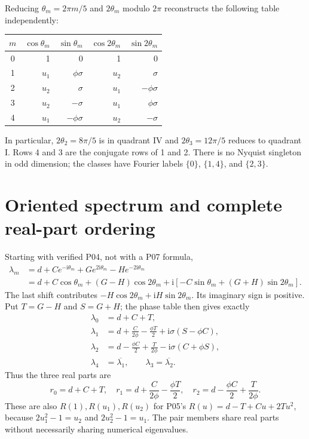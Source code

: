 \documentclass[11pt]{article}
\newcommand{\ii}{\mathrm{i}}
\begin{document}
Reducing $\theta_m=2\pi m/5$ and $2\theta_m$ modulo $2\pi$
reconstructs the following table independently:
\begin{center}
\begin{tabular}{@{}crrrr@{}}
\toprule
$m$&$\cos\theta_m$&$\sin\theta_m$&$\cos2\theta_m$&$\sin2\theta_m$\\\midrule
0&1&0&1&0\\
1&$u_1$&$\phi\sigma$&$u_2$&$\sigma$\\
2&$u_2$&$\sigma$&$u_1$&$-\phi\sigma$\\
3&$u_2$&$-\sigma$&$u_1$&$\phi\sigma$\\
4&$u_1$&$-\phi\sigma$&$u_2$&$-\sigma$\\\bottomrule
\end{tabular}
\end{center}
In particular, $2\theta_2=8\pi/5$ is in quadrant IV and
$2\theta_3=12\pi/5$ reduces to quadrant I. Rows 4 and 3 are
the conjugate rows of 1 and 2. There is no Nyquist singleton in odd
dimension; the classes have Fourier labels $\{0\}$, $\{1,4\}$,
and $\{2,3\}$.

\section{Oriented spectrum and complete real-part ordering}
\label{sec:ordering}
Starting with verified P04, not with a P07 formula,
\begin{align*}
 \lambda_m&=d+Ce^{-\ii\theta_m}+Ge^{2\ii\theta_m}-He^{-2\ii\theta_m}\\
 &=d+C\cos\theta_m+(G-H)\cos2\theta_m
    +\ii[-C\sin\theta_m+(G+H)\sin2\theta_m].
\end{align*}
The last shift contributes $-H\cos2\theta_m+\ii H\sin2\theta_m$.
Its imaginary sign is positive. Put $T=G-H$ and $S=G+H$;
the phase table then gives exactly
\begin{align*}
 \lambda_0&=d+C+T,\\
 \lambda_1&=d+\frac{C}{2\phi}-\frac{\phi T}{2}
                  +\ii\sigma(S-\phi C),\\
 \lambda_2&=d-\frac{\phi C}{2}+\frac{T}{2\phi}
                  -\ii\sigma(C+\phi S),\\
 \lambda_4&=\overline{\lambda_1},\qquad
 \lambda_3=\overline{\lambda_2}.
\end{align*}
Thus the three real parts are
\[
 r_0=d+C+T,\quad r_1=d+\frac{C}{2\phi}-\frac{\phi T}{2},\quad
 r_2=d-\frac{\phi C}{2}+\frac{T}{2\phi}.
\]
These are also $R(1),R(u_1),R(u_2)$ for P05's
$R(u)=d-T+Cu+2Tu^2$, because $2u_1^2-1=u_2$ and
$2u_2^2-1=u_1$. The pair members share real parts without necessarily
sharing numerical eigenvalues.
\end{document}

